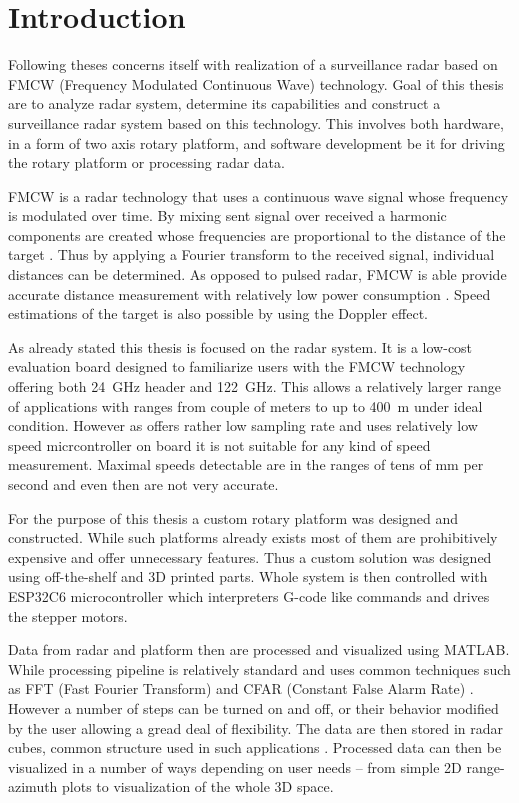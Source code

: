 
\chapter*{Introduction}

Following theses concerns itself with realization of a surveillance radar based on FMCW (Frequency Modulated Continuous Wave) technology.
Goal of this thesis are to analyze \sidar radar system, determine its capabilities and construct a surveillance radar system based on this technology.
This involves both hardware, in a form of two axis rotary platform, and software development be it for driving the rotary platform or processing radar data.

FMCW is a radar technology that uses a continuous wave signal whose frequency is modulated over time.
By mixing sent signal over received a harmonic components are created whose frequencies are proportional to the distance of the target \cite{graham2005}.
Thus by applying a Fourier transform to the received signal, individual distances can be determined.
As opposed to pulsed radar, FMCW is able provide accurate distance measurement with relatively low power consumption \cite{jankiraman2018}.
Speed estimations of the target is also possible by using the Doppler effect.

As already stated this thesis is focused on the \sidar radar system.
It is a low-cost evaluation board designed to familiarize users with the FMCW technology offering both 24~GHz header and 122~GHz\cite{sidarMAN}.
This allows a relatively larger range of applications with ranges from couple of meters to up to 400~m \cite{sidarMANOld} under ideal condition.
However as \sidar offers rather low sampling rate and uses relatively low speed micrcontroller on board it is not suitable for any kind of speed measurement.
Maximal speeds detectable are in the ranges of tens of mm per second and even then are not very accurate.

For the purpose of this thesis a custom rotary platform was designed and constructed.
While such platforms already exists \cite{standa, carl} most of them are prohibitively expensive and offer unnecessary features.
Thus a custom solution was designed using off-the-shelf and 3D printed parts.
Whole system is then controlled with ESP32C6 microcontroller which interpreters G-code like commands and drives the stepper motors.

Data from radar and platform then are processed and visualized using MATLAB.
While processing pipeline is relatively standard and uses common techniques such as FFT (Fast Fourier Transform) and CFAR (Constant False Alarm Rate) \cite{richards2022}.
However a number of steps can be turned on and off, or their behavior modified by the user allowing a gread deal of flexibility.
The data are then stored in radar cubes, common structure used in such applications \cite{richards2022}.
Processed data can then be visualized in a number of ways depending on user needs -- from simple 2D range-azimuth plots to visualization of the whole 3D space.

